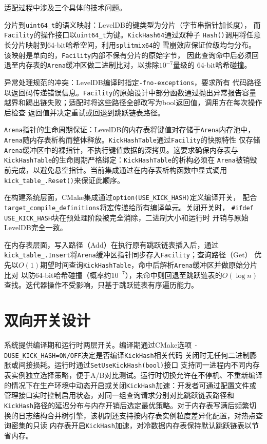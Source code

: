 \documentclass[
    type = bachelor,
    fontset = win,
    decl-page = true,
  ]{njuthesis}
\begin{document}
适配过程中涉及三个具体的技术问题。

分片到\texttt{uint64\_t}的语义映射：LevelDB的键类型为分片（字节串指针加长度），
而\texttt{Facility}的操作接口以\texttt{uint64\_t}为键。\texttt{KickHash64}通过双种子
\texttt{Hash()}调用将任意长分片映射到64-bit哈希空间，利用\texttt{splitmix64}的
雪崩效应保证位级均匀分布。该映射是单向的，\texttt{Facility}内部不保有分片的原始字节，
因此查询命中后必须回退至内存表的\texttt{Arena}缓冲区做二进制比对，以排除$10^{-7}$量级的
64-bit哈希碰撞。

异常处理规范的冲突：LevelDB编译时指定\texttt{-fno-exceptions}，要求所有
代码路径以返回码传递错误信息。\texttt{Facility}的原始设计中部分函数通过抛出异常报告容量
越界和踢出链失败；适配时将这些路径全部改写为bool返回值，调用方在每次操作后检查
返回值并决定重试或回退到跳跃链表路径。

\texttt{Arena}指针的生命周期保证：LevelDB的内存表将键值对存储于\texttt{Arena}内存池中，
\texttt{Arena}随内存表析构而整体释放。\texttt{KickHashTable}通过\texttt{Facility}的快照特性
仅存储\texttt{Arena}缓冲区中的裸指针，不执行键值数据的深拷贝。这要求确保内存表与
\texttt{KickHashTable}的生命周期严格绑定：\texttt{KickHashTable}的析构必须在
\texttt{Arena}被销毁前完成，以避免悬空指针。当前集成通过在内存表析构函数中显式调用
\texttt{kick\_table\_.Reset()}来保证此顺序。

在构建系统层面，CMake集成通过\texttt{option(USE\_KICK\_HASH)}定义编译开关，
配合\texttt{target\_compile\_definitions}将宏传递给所有编译单元。关闭开关时，
\texttt{\#ifdef USE\_KICK\_HASH}块在预处理阶段被完全消除，二进制大小和运行时
开销与原始LevelDB完全一致。

在内存表层面，写入路径（Add）在执行原有跳跃链表插入后，通过\newline
\texttt{kick\_table\_.Insert}将\texttt{Arena}缓冲区指针同步存入\texttt{Facility}；查询路径（Get）
优先以$O(1)$期望时间查询\texttt{KickHashTable}，命中后解析\texttt{Arena}缓冲区并做原始分片比对
以防64-bit哈希碰撞（概率约$10^{-7}$），未命中则回退至跳跃链表的$O(\log n)$
查找。迭代器操作不受影响，只基于跳跃链表有序遍历能力。

\section{双向开关设计}

系统提供编译期和运行时两层开关。编译期通过CMake选项\newline
\texttt{-DUSE\_KICK\_HASH=ON/OFF}决定是否编译\texttt{KickHash}相关代码
关闭时无任何二进制膨胀或间接损耗。运行时通过\texttt{SetUseKickHash(bool)}接口
支持同一进程内不同内存表实例独立选择策略，便于A/B对比测试。运行时切换允许在不停机、不重新编译的情况下在生产环境中动态开启或关闭\texttt{KickHash}加速：开发者可通过配置文件或管理接口实时控制启用状态，对同一组查询请求分别对比跳跃链表路径和\texttt{KickHash}路径的延迟分布与内存开销后选定最优策略。对于内存表写满后频繁切换的日志结构合并树引擎，该机制还支持按内存表实例粒度差异化配置，对热点查询密集的只读 内存表开启\texttt{KickHash}加速，对冷数据内存表保持默认跳跃链表以节省内存。
\end{document}
